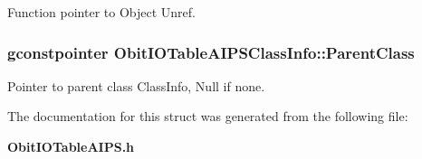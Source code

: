Function pointer to Object Unref. 

\subsubsection{\setlength{\rightskip}{0pt plus 5cm}gconstpointer {\bf Obit\-IOTable\-AIPSClass\-Info::Parent\-Class}}\label{structObitIOTableAIPSClassInfo_o3}


Pointer to parent class Class\-Info, Null if none. 



The documentation for this struct was generated from the following file:\begin{CompactItemize}
\item 
{\bf Obit\-IOTable\-AIPS.h}\end{CompactItemize}
